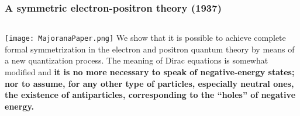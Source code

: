 \begin{frame}
\frametitle{A symmetric electron-positron theory (1937)}
\begin{columns}
\texttt{[image: MajoranaPaper.png]}
We show that it is possible to achieve complete formal symmetrization in the electron and positron quantum theory by means of a new quantization process. The meaning of Dirac equations is somewhat modified and {\bf it is no more necessary to speak of negative-energy states; nor to assume, for any other type of particles, especially neutral ones, the existence of antiparticles, corresponding to the ``holes'' of negative energy.}
\end{columns}
\end{frame}

% 
% 

